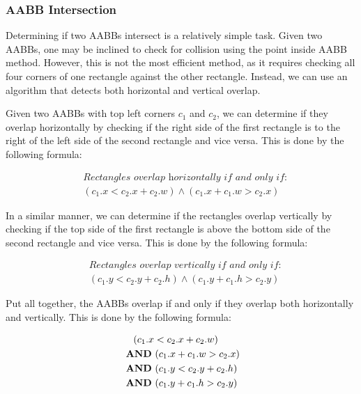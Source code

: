 \newpage
\subsubsection{AABB Intersection}

Determining if two AABBs intersect is a relatively simple task. Given two
AABBs, one may be inclined to check for collision using the point inside AABB
method. However, this is not the most efficient method, as it requires checking
all four corners of one rectangle against the other rectangle. Instead, we can
use an algorithm that detects both horizontal and vertical overlap.

Given two AABBs with top left corners $c_1$ and $c_2$, we can determine if they
overlap horizontally by checking if the right side of the first rectangle is to
the right of the left side of the second rectangle and vice versa. This is done
by the following formula:

\begin{equation}
    \begin{aligned}
         & \textit{Rectangles overlap horizontally if and only if:} \\
         & (c_1.x < c_2.x + c_2.w) \land (c_1.x + c_1.w > c_2.x)
    \end{aligned}
\end{equation}

In a similar manner, we can determine if the rectangles overlap vertically by
checking if the top side of the first rectangle is above the bottom side of the
second rectangle and vice versa. This is done by the following formula:

\begin{equation}
    \begin{aligned}
         & \textit{Rectangles overlap vertically if and only if:} \\
         & (c_1.y < c_2.y + c_2.h) \land (c_1.y + c_1.h > c_2.y)
    \end{aligned}
\end{equation}

Put all together, the AABBs overlap if and only if they overlap both
horizontally and vertically. This is done by the following formula:

\begin{equation}
    \begin{aligned}
         & \hspace{1.1em} (c_1.x < c_2.x + c_2.w) \\
         & \land (c_1.x + c_1.w > c_2.x)          \\
         & \land (c_1.y < c_2.y + c_2.h)          \\
         & \land (c_1.y + c_1.h > c_2.y)
    \end{aligned}
\end{equation}

